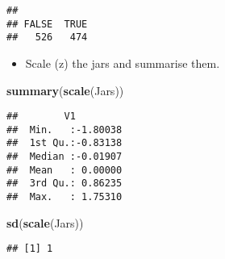 \documentclass[ignorenonframetext,]{beamer}
\newenvironment{Shaded}{\begin{snugshade}}{\end{snugshade}}
\newcommand{\KeywordTok}[1]{\textcolor[rgb]{0.13,0.29,0.53}{\textbf{#1}}}
\newcommand{\NormalTok}[1]{#1}
\providecommand{\tightlist}{%
  \setlength{\itemsep}{0pt}\setlength{\parskip}{0pt}}
\begin{document}
\begin{verbatim}
## 
## FALSE  TRUE 
##   526   474
\end{verbatim}

\begin{itemize}[<+->]
\tightlist
\item
  Scale (z) the jars and summarise them.
\end{itemize}

\begin{Shaded}
\begin{Highlighting}[]
\KeywordTok{summary}\NormalTok{(}\KeywordTok{scale}\NormalTok{(Jars))}
\end{Highlighting}
\end{Shaded}

\begin{verbatim}
##        V1          
##  Min.   :-1.80038  
##  1st Qu.:-0.83138  
##  Median :-0.01907  
##  Mean   : 0.00000  
##  3rd Qu.: 0.86235  
##  Max.   : 1.75310
\end{verbatim}

\begin{Shaded}
\begin{Highlighting}[]
\KeywordTok{sd}\NormalTok{(}\KeywordTok{scale}\NormalTok{(Jars))}
\end{Highlighting}
\end{Shaded}

\begin{verbatim}
## [1] 1
\end{verbatim}
\end{document}
